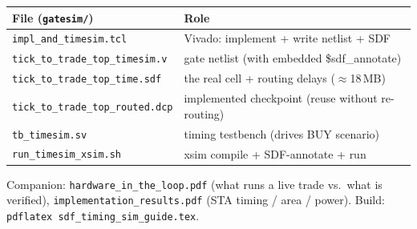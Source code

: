 \documentclass[10pt,a4paper]{article}
\newcommand{\fpath}[1]{\texttt{\textcolor{hdrblue}{#1}}}
\begin{document}
\begin{center}\small
\renewcommand{\arraystretch}{1.2}
\begin{tabularx}{\linewidth}{@{}>{\raggedright\arraybackslash}p{6.0cm} X@{}}
\toprule
\textbf{File (\fpath{gatesim/})} & \textbf{Role} \\
\midrule
\fpath{impl\_and\_timesim.tcl}            & Vivado: implement + write netlist + SDF \\
\fpath{tick\_to\_trade\_top\_timesim.v}   & gate netlist (with embedded \$sdf\_annotate) \\
\fpath{tick\_to\_trade\_top\_time.sdf}    & the real cell + routing delays ($\approx$18\,MB) \\
\fpath{tick\_to\_trade\_top\_routed.dcp}  & implemented checkpoint (reuse without re-routing) \\
\fpath{tb\_timesim.sv}                    & timing testbench (drives BUY scenario) \\
\fpath{run\_timesim\_xsim.sh}             & xsim compile + SDF-annotate + run \\
\bottomrule
\end{tabularx}
\end{center}

\vfill
{\small\color{rulegray} Companion: \fpath{hardware\_in\_the\_loop.pdf} (what runs a
live trade vs.\ what is verified), \fpath{implementation\_results.pdf} (STA timing /
area / power). Build: \texttt{pdflatex sdf\_timing\_sim\_guide.tex}.}
\end{document}
